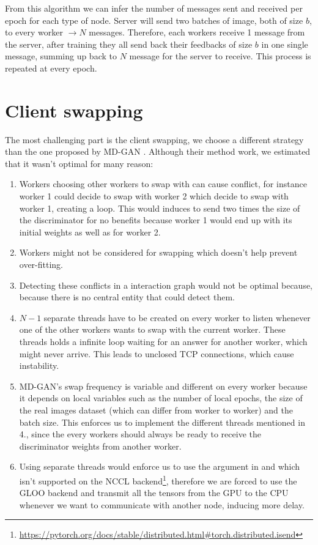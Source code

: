 From this algorithm we can infer the number of messages sent and received per epoch for each type of node. Server will send two batches of image, both of size $b$, to every worker $\rightarrow N$ messages. Therefore, each workers receive 1 message from the server, after training they all send back their feedbacks of size $b$ in one single message, summing up back to $N$ message for the server to receive. This process is repeated at every epoch.

\section{Client swapping}
The most challenging part is the client swapping, we choose a different strategy than the one proposed by MD-GAN \cite{mdgan}. Although their method work, we estimated that it wasn't optimal for many reason:
\begin{enumerate}
    \item Workers choosing other workers to swap with can cause conflict, for instance worker 1 could decide to swap with worker 2 which decide to swap with worker 1, creating a loop. This would induces to send two times the size of the discriminator for no benefits because worker 1 would end up with its initial weights as well as for worker 2.
    \item Workers might not be considered for swapping which doesn't help prevent over-fitting.
    \item Detecting these conflicts in a interaction graph would not be optimal because, because there is no central entity that could detect them.
    \item $N-1$ separate threads have to be created on every worker to listen whenever one of the other workers wants to swap with the current worker. These threads holds a infinite loop waiting for an answer for another worker, which might never arrive. This leads to unclosed TCP connections, which cause instability. 
    \item MD-GAN's swap frequency is variable and different on every worker because it depends on local variables such as the number of local epochs, the size of the real images dataset (which can differ from worker to worker) and the batch size. This enforces us to implement the different threads mentioned in 4., since the every workers should always be ready to receive the discriminator weights from another worker.
    \item Using separate threads would enforce us to use the  argument in  and  which isn't supported on the NCCL backend\footnote{\url{https://pytorch.org/docs/stable/distributed.html\#torch.distributed.isend}}, therefore we are forced to use the GLOO backend and transmit all the tensors from the GPU to the CPU whenever we want to communicate with another node, inducing more delay.
\end{enumerate}

